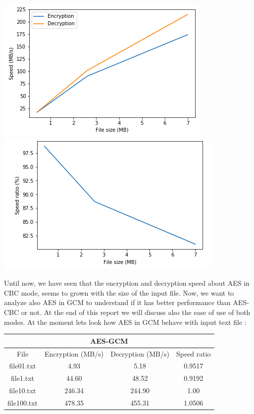 \documentclass[11pt]{article}
\begin{document}
\begin{center}
\includegraphics[scale=0.4]{./aes_cbc_speed_comparison_images.png}
\includegraphics[scale=0.4]{./aes_cbc_speed_ratio_images.png}
\end{center}
Until now, we have seen that the encryption and decryption speed about AES in CBC mode, seems to grown with the size of the input file. Now, we want to analyze also AES in GCM to understand if it has better performance than AES-CBC or not. At the end of this report we will discuss also the ease of use of both modes. At the moment lets look how AES in GCM behave with input text file :
\begin{center}
\begin{tabular}{| c | c | c | c |}
\hline
\multicolumn{4}{|c|}{AES-GCM} \\
\hline
File & Encryption (MB/s) & Decryption (MB/s) & Speed ratio\\
\hline
file01.txt & 4.93 & 5.18 & 0.9517 \\
\hline
file1.txt & 44.60 & 48.52 & 0.9192 \\
\hline
file10.txt & 246.34 & 244.90  & 1.00 \\
\hline
file100.txt & 478.35 & 455.31  & 1.0506 \\
\hline
\end{tabular}
\end{center}
\end{document}
